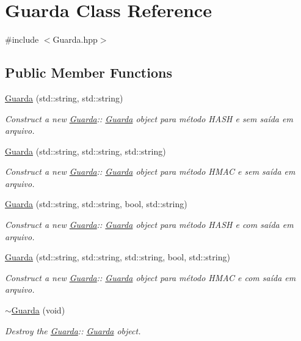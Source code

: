 \hypertarget{class_guarda}{}\section{Guarda Class Reference}
\label{class_guarda}


{\ttfamily \#include $<$Guarda.\+hpp$>$}

\subsection*{Public Member Functions}
\begin{DoxyCompactItemize}
\item 
\hyperlink{class_guarda_a5d30e218759232802910bb3cabaddd2e}{Guarda} (std\+::string, std\+::string)
\begin{DoxyCompactList}\small\item\em Construct a new \hyperlink{class_guarda}{Guarda}\+:\+: \hyperlink{class_guarda}{Guarda} object para método H\+A\+SH e sem saída em arquivo. \end{DoxyCompactList}\item 
\hyperlink{class_guarda_a296a1dd9b44b5a69e693692d5edccfe5}{Guarda} (std\+::string, std\+::string, std\+::string)
\begin{DoxyCompactList}\small\item\em Construct a new \hyperlink{class_guarda}{Guarda}\+:\+: \hyperlink{class_guarda}{Guarda} object para método H\+M\+AC e sem saída em arquivo. \end{DoxyCompactList}\item 
\hyperlink{class_guarda_a3a1bf11b17ec5a11a3898b2cd7a84db4}{Guarda} (std\+::string, std\+::string, bool, std\+::string)
\begin{DoxyCompactList}\small\item\em Construct a new \hyperlink{class_guarda}{Guarda}\+:\+: \hyperlink{class_guarda}{Guarda} object para método H\+A\+SH e com saída em arquivo. \end{DoxyCompactList}\item 
\hyperlink{class_guarda_a10e2b924623ddfbbd76c3f8bb72eeaa1}{Guarda} (std\+::string, std\+::string, std\+::string, bool, std\+::string)
\begin{DoxyCompactList}\small\item\em Construct a new \hyperlink{class_guarda}{Guarda}\+:\+: \hyperlink{class_guarda}{Guarda} object para método H\+M\+AC e com saída em arquivo. \end{DoxyCompactList}\item 
\hyperlink{class_guarda_a07d37de01a671d0b698607ba872c3a76}{$\sim$\+Guarda} (void)
\begin{DoxyCompactList}\small\item\em Destroy the \hyperlink{class_guarda}{Guarda}\+:\+: \hyperlink{class_guarda}{Guarda} object. \end{DoxyCompactList}\end{DoxyCompactItemize}



